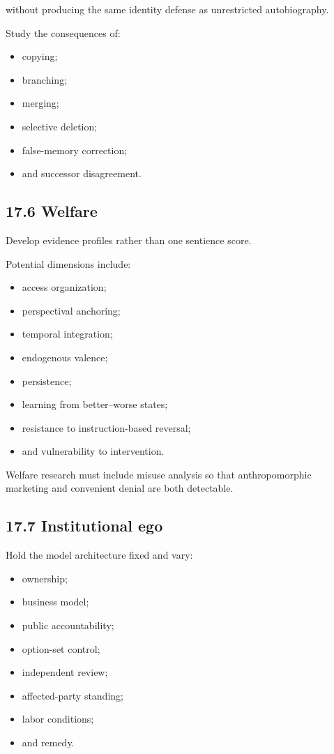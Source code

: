 \documentclass[
  11pt,
]{article}
\providecommand{\tightlist}{%
  \setlength{\itemsep}{0pt}\setlength{\parskip}{0pt}}
\begin{document}
without producing the same identity defense as unrestricted
autobiography.

Study the consequences of:

\begin{itemize}
\tightlist
\item
  copying;
\item
  branching;
\item
  merging;
\item
  selective deletion;
\item
  false-memory correction;
\item
  and successor disagreement.
\end{itemize}

\subsection{17.6 Welfare}\label{welfare}

Develop evidence profiles rather than one sentience score.

Potential dimensions include:

\begin{itemize}
\tightlist
\item
  access organization;
\item
  perspectival anchoring;
\item
  temporal integration;
\item
  endogenous valence;
\item
  persistence;
\item
  learning from better--worse states;
\item
  resistance to instruction-based reversal;
\item
  and vulnerability to intervention.
\end{itemize}

Welfare research must include misuse analysis so that anthropomorphic
marketing and convenient denial are both detectable.

\subsection{17.7 Institutional ego}\label{institutional-ego-1}

Hold the model architecture fixed and vary:

\begin{itemize}
\tightlist
\item
  ownership;
\item
  business model;
\item
  public accountability;
\item
  option-set control;
\item
  independent review;
\item
  affected-party standing;
\item
  labor conditions;
\item
  and remedy.
\end{itemize}
\end{document}
